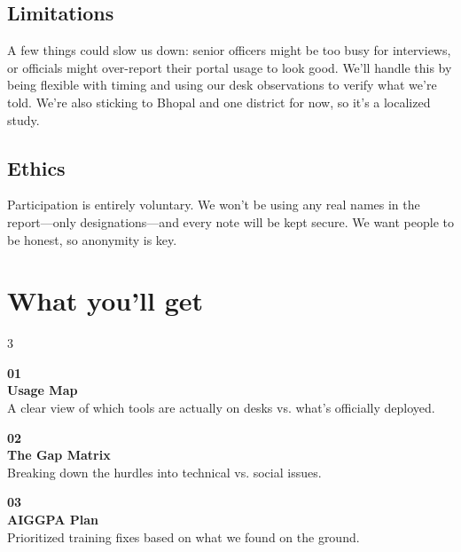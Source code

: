 \documentclass[11pt,a4paper]{article}
\begin{document}
\vspace{0.2cm}

\subsection{Limitations}
A few things could slow us down: senior officers might be too busy for 
interviews, or officials might over-report their portal usage to look 
good. We'll handle this by being flexible with timing and using our 
desk observations to verify what we’re told. We’re also sticking to 
Bhopal and one district for now, so it’s a localized study.

\subsection{Ethics}
Participation is entirely voluntary. We won't be using any real names in 
the report—only designations—and every note will be kept secure. We 
want people to be honest, so anonymity is key.

\section{What you'll get}

\vspace{0.2cm}
\begin{multicols}{3}

\begin{tcolorbox}[colback=navyblue,colframe=navyblue,arc=4mm,
  left=8pt,right=8pt,top=8pt,bottom=8pt]
\centering
{\color{gold}\bfseries\large 01}\\[4pt]
{\color{white}\small\textbf{Usage Map}\\[4pt]
A clear view of which tools are actually on desks vs. what's officially deployed.}
\end{tcolorbox}

\columnbreak

\begin{tcolorbox}[colback=accentteal,colframe=accentteal,arc=4mm,
  left=8pt,right=8pt,top=8pt,bottom=8pt]
\centering
{\color{white}\bfseries\large 02}\\[4pt]
{\color{white}\small\textbf{The Gap Matrix}\\[4pt]
Breaking down the hurdles into technical vs. social issues.}
\end{tcolorbox}

\columnbreak

\begin{tcolorbox}[colback=gold,colframe=gold,arc=4mm,
  left=8pt,right=8pt,top=8pt,bottom=8pt]
\centering
{\color{navyblue}\bfseries\large 03}\\[4pt]
{\color{navyblue}\small\textbf{AIGGPA Plan}\\[4pt]
Prioritized training fixes based on what we found on the ground.}
\end{tcolorbox}

\end{multicols}
\end{document}
